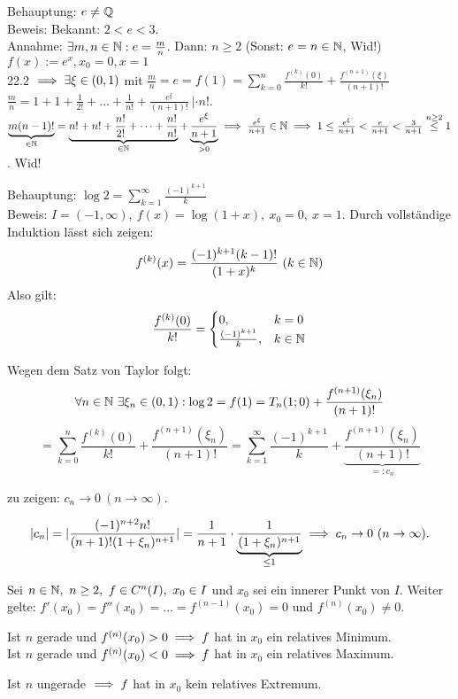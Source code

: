 \documentclass[a4paper,twoside,DIV15,BCOR12mm]{scrbook}
\begin{document}
\begin{beispiele}
\item Behauptung: $e \ne \mathbb{Q}$ \\
Beweis: Bekannt: $2<e<3$. \\
Annahme: $\exists m,n\in\mathbb{N}: e=\frac{m}{n}$. Dann: $n\ge 2$ (Sonst: $e=n\in\mathbb{N}$, Wid!)\
$f(x):= e^x, x_0 = 0, x=1$ \\
22.2 $\implies \exists \xi \in (0,1)$ mit $\frac{m}{n}=e=f(1)=\sum_{k=0}^n\frac{f^{(k)}(0)}{k!} + \frac{f^{(n+1)}(\xi)}{(n+1)!}$\\
$\frac{m}{n} = 1 + 1+ \frac{1}{2!} + \ldots + \frac{1}{n!} + \frac{e^\xi}{(n+1)!}\  | \cdot n!$. \\
$\underbrace{m(n-1)!}_{\in\mathbb{N}} = \underbrace{n! + n! + \frac{n!}{2!} + \cdots + \frac{n!}{n!}}_{\in \mathbb{N}} + \underbrace{\frac{e^\xi}{n+1}}_{>0} \implies \frac{e^\xi}{n+1} \in \mathbb{N} \implies 1 \le \frac{e^\xi}{n+1} < \frac{e}{n+1} < \frac{3}{n+1} \stackrel{n\ge2}{\le} 1$. Wid!
\item Behauptung: $\log 2 = \sum_{k=1}^{\infty}{\frac{(-1)^{k+1}}{k}}$\\
Beweis: $I = (-1,\infty),\ f(x) = \log(1+x),\ x_0=0,\ x=1.$ Durch vollständige Induktion lässt sich zeigen:
$$f^{(k)}(x) = \frac{(-1)^{k+1}(k-1)!}{(1+x)^k}\ (k\in\MdN)$$
Also gilt:
$$\frac{f^{(k)}(0)}{k!} = \begin{cases}
0,&k=0\\
\frac{(-1)^{k+1}}{k},&k\in\mathbb{N}
\end{cases}$$

Wegen dem Satz von Taylor folgt:
$$\forall n\in\mathbb{N}\ \exists \xi_n\in(0,1): \log 2 = f(1) = T_n(1;0) + \frac{f^{(n+1)}(\xi_n)}{(n+1)!}$$
$$= \sum_{k=0}^{n}{\frac{f^{(k)}(0)}{k!}} + \frac{f^{(n+1)}(\xi_n)}{(n+1)!} = \sum_{k=1}^{\infty}{\frac{(-1)^{k+1}}{k}} + \underbrace{\frac{f^{(n+1)}(\xi_n)}{(n+1)!}}_{=:c_n}$$

zu zeigen: $c_n \to 0\ (n \to \infty).$

$$|c_n| = |\frac{(-1)^{n+2}n!}{(n+1)!(1+\xi_n)^{n+1}}| = \frac{1}{n+1} \cdot \underbrace{\frac{1}{(1+\xi_n)^{n+1}}}_{\le 1} \implies c_n \to 0\ (n \to \infty).$$
\end{beispiele}

\begin{satz}
Sei $n \in \MdN,\ n \ge 2,\ f \in C^n(I),\ x_0 \in I$ und $x_0$ sei ein innerer Punkt von $I$. Weiter gelte: $f'(x_0) = f''(x_0) = \ldots = f^{(n-1)}(x_0) = 0$ und $f^{(n)}(x_0) \ne 0.$
\begin{liste}
\item Ist $n$ gerade und $f^{(n)}(x_0) > 0 \implies f$ hat in $x_0$ ein relatives Minimum.\\
Ist $n$ gerade und $f^{(n)}(x_0) < 0 \implies f$ hat in $x_0$ ein relatives Maximum.
\item Ist $n$ ungerade $\implies f$ hat in $x_0$ kein relatives Extremum.
\end{liste}
\end{satz}
\end{document}
